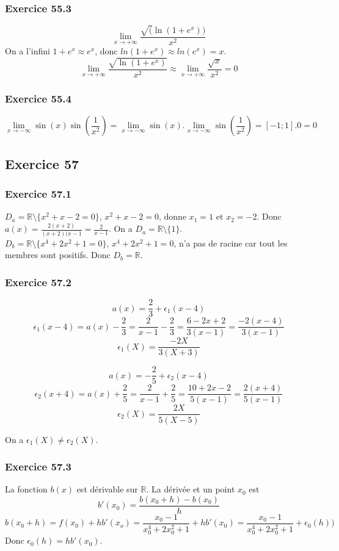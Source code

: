 \documentclass[]{book}
\theoremstyle{definition}
\newcommand{\bb}[1]{\mathbb{#1}}
\newcommand{\R}{\bb{R}}
\begin{document}
\subsubsection*{Exercice 55.3}
$$\lim_{x\to+\infty}\frac{\sqrt(\ln(1+e^x))}{x^2}$$
On a l'infini $1+e^x \approx e^x$, donc $ln(1+e^x) \approx ln(e^x) = x$.\\
$$\lim_{x\to+\infty}\frac{\sqrt{\ln(1+e^x)}}{x^2} \approx \lim_{x\to+\infty}\frac{\sqrt{x}}{x^2} = 0$$

\subsubsection*{Exercice 55.4}
$$\lim_{x\to-\infty}\sin(x)\sin(\frac{1}{x^2}) = \lim_{x\to-\infty}\sin(x).\lim_{x\to-\infty}\sin(\frac{1}{x^2}) = [-1;1].0 = 0$$


\subsection*{Exercice 57}
\subsubsection*{Exercice 57.1}

$D_a = \R \setminus\{x^2+x-2 = 0\}$, $x^2+x-2 = 0$, donne $x_1 = 1$ et $x_2 = -2$. Donc $a(x) = \frac{2(x+2)}{(x+2)(x-1} = \frac{2}{x-1}$. On a $D_a = \R \setminus\{1\}$.\\
$D_b = \R \setminus\{x^4+2x^2+1 = 0\}$, $x^4+2x^2+1 = 0$, n'a pas de racine car tout les membres sont positifs. Donc $D_b = \R$.\\

\subsubsection*{Exercice 57.2}
$$a(x) = \frac{2}{3} + \epsilon_1(x-4)$$
$$\epsilon_1(x-4) = a(x) - \frac{2}{3} = \frac{2}{x-1} - \frac{2}{3} = \frac{6-2x+2}{3(x-1)} = \frac{-2(x-4)}{3(x-1)}$$
$$\epsilon_1(X) = \frac{-2X}{3(X+3)}$$

$$a(x) = -\frac{2}{5} + \epsilon_2(x-4)$$
$$\epsilon_2(x+4) = a(x) + \frac{2}{5} = \frac{2}{x-1} + \frac{2}{5} = \frac{10+2x-2}{5(x-1)} = \frac{2(x+4)}{5(x-1)}$$
$$\epsilon_2(X) = \frac{2X}{5(X-5)}$$

On a $\epsilon_1(X) \neq \epsilon_2(X)$.

\subsubsection*{Exercice 57.3}
La fonction $b(x)$ est d\'erivable sur $\R$. La d\'eriv\'ee et un point $x_0$ est\\
$$b'(x_0) = \frac{b(x_0+h)-b(x_0)}{h}$$
$$b(x_0+h) = f(x_0) + hb'(x_o) = \frac{x_0-1}{x_0^4+2x_0^2+1} +hb'(x_0) = \frac{x_0-1}{x_0^4+2x_0^2+1} +\epsilon_0(h))$$
Donc $\epsilon_0(h) = hb'(x_0)$.\\
\end{document}
